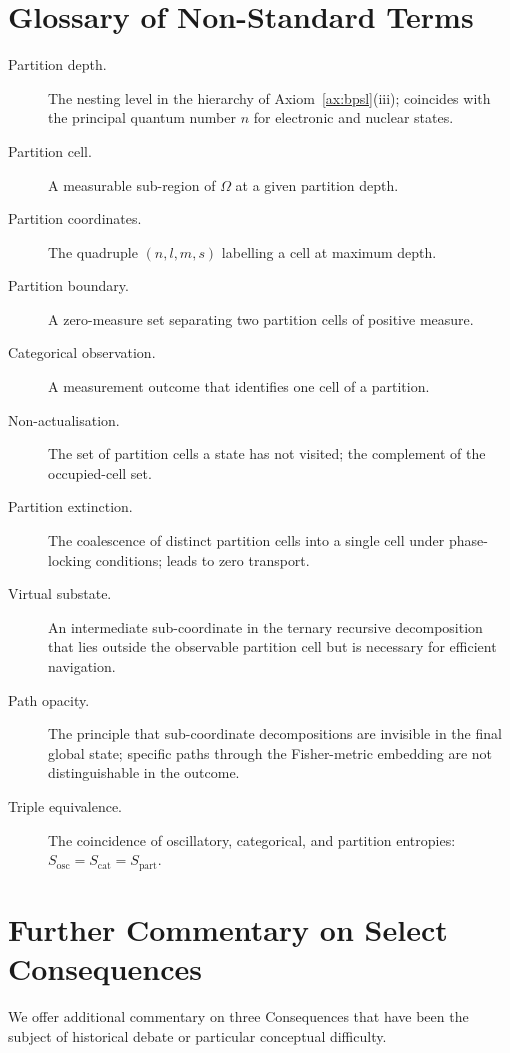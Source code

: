 \documentclass[11pt,twocolumn,a4paper]{article}
\theoremstyle{axiomstyle}
\theoremstyle{conseqstyle}
\theoremstyle{definition}
\theoremstyle{remark}
\newcommand{\Sk}{S_{\mathrm{osc}}}
\newcommand{\St}{S_{\mathrm{cat}}}
\newcommand{\Se}{S_{\mathrm{part}}}
\begin{document}
\section{Glossary of Non-Standard Terms}
\label{app:glossary}

\begin{description}
\item[Partition depth.] The nesting level in the hierarchy of Axiom~\ref{ax:bpsl}(iii); coincides with the principal quantum number $n$ for electronic and nuclear states.
\item[Partition cell.] A measurable sub-region of $\Omega$ at a given partition depth.
\item[Partition coordinates.] The quadruple $(n,l,m,s)$ labelling a cell at maximum depth.
\item[Partition boundary.] A zero-measure set separating two partition cells of positive measure.
\item[Categorical observation.] A measurement outcome that identifies one cell of a partition.
\item[Non-actualisation.] The set of partition cells a state has not visited; the complement of the occupied-cell set.
\item[Partition extinction.] The coalescence of distinct partition cells into a single cell under phase-locking conditions; leads to zero transport.
\item[Virtual substate.] An intermediate sub-coordinate in the ternary recursive decomposition that lies outside the observable partition cell but is necessary for efficient navigation.
\item[Path opacity.] The principle that sub-coordinate decompositions are invisible in the final global state; specific paths through the Fisher-metric embedding are not distinguishable in the outcome.
\item[Triple equivalence.] The coincidence of oscillatory, categorical, and partition entropies: $\Sk=\St=\Se$.
\end{description}

\section{Further Commentary on Select Consequences}
\label{app:commentary}

We offer additional commentary on three Consequences that have been the subject of historical debate or particular conceptual difficulty.
\end{document}
